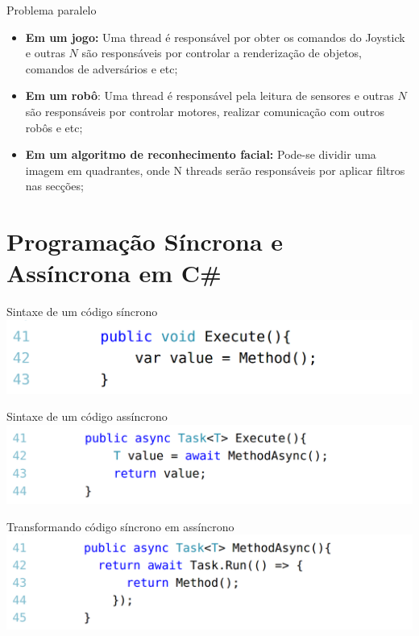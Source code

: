 \documentclass[10pt]{beamer}
\begin{document}
\begin{frame}[fragile]{Problema paralelo}
	\begin{itemize}
		\item \textbf{Em um jogo:} Uma thread é responsável por obter os comandos do Joystick e outras $N$ são responsáveis por controlar a renderização de objetos, comandos de adversários e etc;
		\vspace{0.2cm}
		\item \textbf{Em um robô}: Uma thread é responsável pela leitura de sensores e outras $N$ são responsáveis por controlar motores, realizar comunicação com outros robôs e etc;
		\vspace{0.2cm}
		\item \textbf{Em um algoritmo de reconhecimento facial:} Pode-se dividir uma imagem em quadrantes, onde N threads serão responsáveis por aplicar filtros nas secções;
	\end{itemize}
\end{frame}

\section{Programação Síncrona e Assíncrona em C\#}

\begin{frame}{Sintaxe de um código síncrono}
	\includegraphics[scale=0.28]{imgs/00-sync.png}
\end{frame}

\begin{frame}{Sintaxe de um código assíncrono}
	\includegraphics[width=\textwidth]{imgs/01-async.png}
\end{frame}

\begin{frame}{Transformando código síncrono em assíncrono}
	\includegraphics[width=\textwidth]{imgs/02-syncToAsync.png}
\end{frame}
\end{document}
